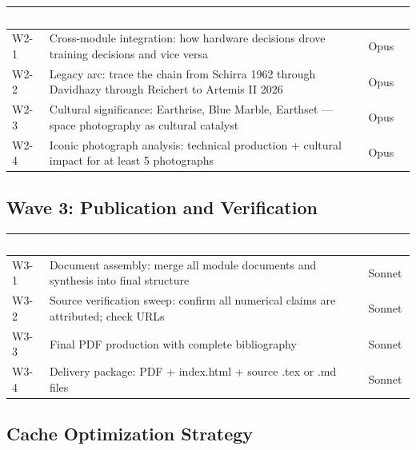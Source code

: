 \documentclass[11pt,letterpaper]{article}
\newcommand{\tableheader}[1]{\textbf{\sffamily\textcolor{white}{#1}}}
\begin{document}
\begin{center}
\begin{tabularx}{\textwidth}{L{1.5cm}XL{2.5cm}}
\toprule
{}
\tableheader{Task} & \tableheader{Description} & \tableheader{Model} \\
\midrule
W2-1 & Cross-module integration: how hardware decisions drove training decisions and vice versa & Opus \\
W2-2 & Legacy arc: trace the chain from Schirra 1962 through Davidhazy through Reichert to Artemis II 2026 & Opus \\
W2-3 & Cultural significance: Earthrise, Blue Marble, Earthset --- space photography as cultural catalyst & Opus \\
W2-4 & Iconic photograph analysis: technical production + cultural impact for at least 5 photographs & Opus \\
\bottomrule
\end{tabularx}
\end{center}

\subsection{Wave 3: Publication and Verification}

\begin{center}
\begin{tabularx}{\textwidth}{L{1.5cm}XL{2cm}}
\toprule
{}
\tableheader{Task} & \tableheader{Description} & \tableheader{Model} \\
\midrule
W3-1 & Document assembly: merge all module documents and synthesis into final structure & Sonnet \\
W3-2 & Source verification sweep: confirm all numerical claims are attributed; check URLs & Sonnet \\
W3-3 & Final PDF production with complete bibliography & Sonnet \\
W3-4 & Delivery package: PDF + index.html + source .tex or .md files & Sonnet \\
\bottomrule
\end{tabularx}
\end{center}

\subsection{Cache Optimization Strategy}
\end{document}
